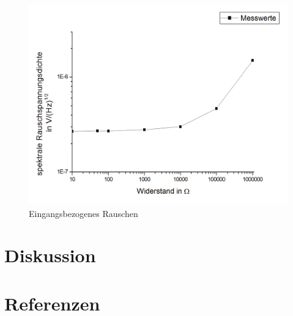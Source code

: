 \documentclass{article}						%
\begin{document}
		\begin{figure}[h!]
			\centering
			\includegraphics[scale=0.4]{EingangsbezogenesRauschen}
			\caption{Eingangsbezogenes Rauschen}
		\end{figure}
		
		\clearpage
\section{Diskussion}

\section{Referenzen}
				
\end{document}
